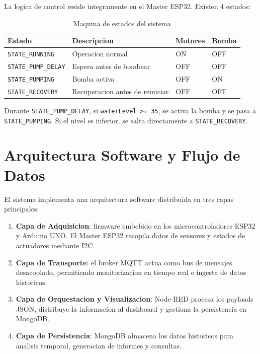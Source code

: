 La logica de control reside integramente en el Master ESP32. Existen 4 estados:

\begin{table}[H]
\centering
\small
\caption{Maquina de estados del sistema}
\label{tab:maquina-estados}
\begin{tabularx}{\textwidth}{@{}lXXX@{}}
\toprule
\textbf{Estado} & \textbf{Descripcion} & \textbf{Motores} & \textbf{Bomba} \\
\midrule
\texttt{STATE\_RUNNING} & Operacion normal & ON & OFF \\
\texttt{STATE\_PUMP\_DELAY} & Espera antes de bombear & OFF & OFF \\
\texttt{STATE\_PUMPING} & Bomba activa & OFF & ON \\
\texttt{STATE\_RECOVERY} & Recuperacion antes de reiniciar & OFF & OFF \\
\bottomrule
\end{tabularx}
\end{table}
Durante \texttt{STATE\_PUMP\_DELAY}, si \texttt{waterLevel >= 35}, se activa la bomba y se pasa a \texttt{STATE\_PUMPING}. Si el nivel es inferior, se salta directamente a \texttt{STATE\_RECOVERY}.








\section{Arquitectura Software y Flujo de Datos}

El sistema implementa una arquitectura software distribuida en tres capas principales:

\begin{enumerate}
    \item \textbf{Capa de Adquisicion}: firmware embebido en los microcontroladores ESP32 y Arduino UNO. El Master ESP32 recopila datos de sensores y estados de actuadores mediante I2C.
    \item \textbf{Capa de Transporte}: el broker MQTT actua como bus de mensajes desacoplado, permitiendo monitorizacion en tiempo real e ingesta de datos historicos.
    \item \textbf{Capa de Orquestacion y Visualizacion}: Node-RED procesa los payloads JSON, distribuye la informacion al dashboard y gestiona la persistencia en MongoDB.
    \item \textbf{Capa de Persistencia}: MongoDB almacena los datos historicos para analisis temporal, generacion de informes y consultas.
\end{enumerate}

